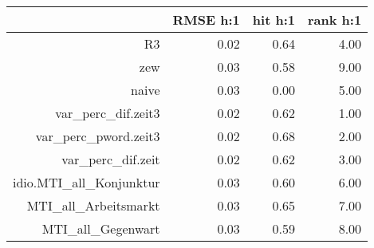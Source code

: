 \begin{table}[ht]
\centering
\begin{tabular}{rrrr}
  \hline
 & RMSE h:1 & hit h:1 & rank h:1 \\ 
  \hline
R3 & 0.02 & 0.64 & 4.00 \\ 
  zew & 0.03 & 0.58 & 9.00 \\ 
  naive & 0.03 & 0.00 & 5.00 \\ 
  var\_perc\_dif.zeit3 & 0.02 & 0.62 & 1.00 \\ 
  var\_perc\_pword.zeit3 & 0.02 & 0.68 & 2.00 \\ 
  var\_perc\_dif.zeit & 0.02 & 0.62 & 3.00 \\ 
  idio.MTI\_all\_Konjunktur & 0.03 & 0.60 & 6.00 \\ 
  MTI\_all\_Arbeitsmarkt & 0.03 & 0.65 & 7.00 \\ 
  MTI\_all\_Gegenwart & 0.03 & 0.59 & 8.00 \\ 
   \hline
\end{tabular}
\end{table}
